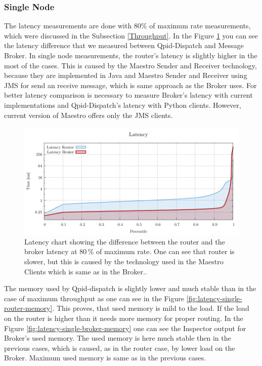 \subsubsection*{Single Node}
The latency measurements are done with 80\% of maximum rate measurements, which were discussed in the Subsection \ref{Throughput}. In the Figure \ref{fig:latency-single-router} you can see the latency difference that we measured between Qpid-Dispatch and Message Broker. In single node measurements, the router's latency is slightly higher in the most of the cases. This is caused by the Maestro Sender and Receiver technology, because they are implemented in Java and Maestro Sender and Receiver using JMS for send an receive message, which is same approach as the Broker uses. For better latency comparison is necessary to measure Broker's latency with current implementations and Qpid-Dispatch's latency with Python clients. However, current version of Maestro offers only the JMS clients.

\begin{figure}[H]
	\centering
	\includegraphics[width=1\linewidth]{obrazky-figures/charts/singlepoint-latency.pdf}
	\caption{Latency chart showing the difference between the router and the broker latency at 80\,\% of maximum rate. One can see that router is slower, but this is caused by the technology used in the Maestro Clients which is same as in the Broker..}
	\label{fig:latency-single-router}
\end{figure}

The memory used by Qpid-dispatch is slightly lower and much stable than in the case of maximum throughput as one can see in the Figure \ref{fig:latency-single-router-memory}. This proves, that used memory is mild to the  load. If the load on the router is higher than it needs more memory for proper routing. In the Figure \ref{fig:latency-single-broker-memory} one can see the Inspector output for Broker's used memory. The used memory is here much stable then in the previous cases, which is caused, as in the router case, by lower load on the Broker. Maximum used memory is same as in the previous cases.

